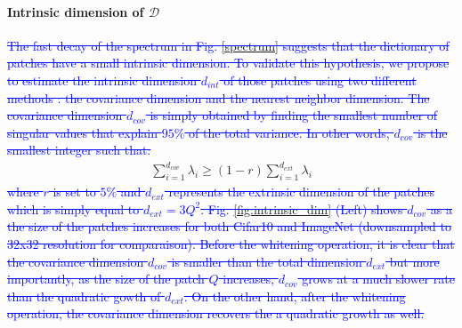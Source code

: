 \documentclass{article}
\newcommand{\Edouard}[1]{\textcolor{blue}{#1}}
\begin{document}
{\paragraph{Intrinsic dimension of $\mathcal{D}$}\Edouard{\sout{
The fast decay of the spectrum in Fig. \ref{spectrum} suggests that the dictionary of patches have a small intrinsic dimension. To validate this hypothesis, we propose to estimate the intrinsic dimension $d_{int}$ of those patches using two different methods : the covariance dimension and the nearest neighbor dimension. 
The covariance dimension  $ d_{cov}$ is simply obtained by finding the smallest number of singular values that explain $95\%$ of the total variance. In other words, $d_{cov}$ is the smallest integer such that:}}
\begin{align}
	 \sum_{i=1}^{d_{cov}} \lambda_i \geq (1-r) \sum_{i=1}^{d_{ext}} \lambda_i
\end{align}\Edouard{\sout{
where $r$ is set to $5\%$ and  $d_{ext}$ represents the extrinsic dimension of the patches which is simply equal to $d_{ext} = 3 Q^2$. Fig. \ref{fig:intrinsic_dim} (Left) shows $d_{cov}$ as a the size of the patches increases for both Cifar10 and ImageNet (downsampled to 32x32 resolution for comparaison). Before the whitening operation, it is clear that the covariance dimension $d_{cov}$ is smaller than the total dimension $d_{ext}$ but more importantly, as the size of the patch $Q$  increases, $d_{cov}$ grows at a much slower rate than the quadratic gowth of $d_{ext}$. On the other hand, after the whitening operation, the covariance dimension recovers the a quadratic growth as well.}}

}
\end{document}

